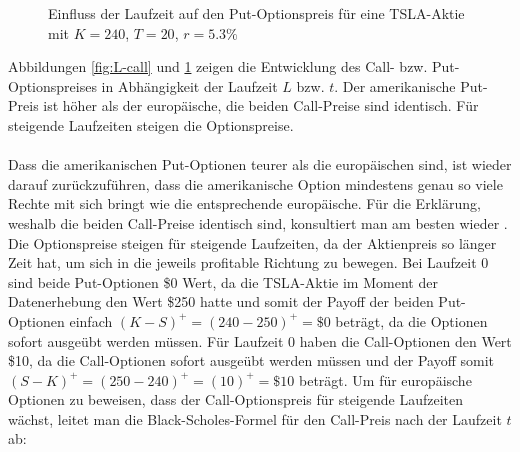 \documentclass[11pt]{report} %
\begin{document}
\begin{figure}[H]
    \centering
    \caption{Einfluss der Laufzeit auf den Put-Optionspreis für eine TSLA-Aktie mit $K=240$, $T=20$, $r=5.3\%$}
    \label{fig:L-put}
\end{figure}
Abbildungen \ref{fig:L-call} und \ref{fig:L-put} zeigen die Entwicklung des Call- bzw. Put-Optionspreises in Abhängigkeit der Laufzeit $L$ bzw. $t$. Der amerikanische Put-Preis ist höher als der europäische, die beiden Call-Preise sind identisch. Für steigende Laufzeiten steigen die Optionspreise.\\\\Dass die amerikanischen Put-Optionen teurer als die europäischen sind, ist wieder darauf zurückzuführen, dass die amerikanische Option mindestens genau so viele Rechte mit sich bringt wie die entsprechende europäische. Für die Erklärung, weshalb die beiden Call-Preise identisch sind, konsultiert man am besten wieder \textcite{Adelmeyer2003}. \\Die Optionspreise steigen für steigende Laufzeiten, da der Aktienpreis so länger Zeit hat, um sich in die jeweils profitable Richtung zu bewegen. Bei Laufzeit 0 sind beide Put-Optionen \$0 Wert, da die TSLA-Aktie im Moment der Datenerhebung den Wert \$250 hatte und somit der Payoff der beiden Put-Optionen einfach $(K-S)^+=(240-250)^+=\$0$ beträgt, da die Optionen sofort ausgeübt werden müssen. Für Laufzeit 0 haben die Call-Optionen den Wert \$10, da die Call-Optionen sofort ausgeübt werden müssen und der Payoff somit $(S-K)^+=(250-240)^+=(10)^+=\$10$ beträgt. Um für europäische Optionen zu beweisen, dass der Call-Optionspreis für steigende Laufzeiten wächst, leitet man die Black-Scholes-Formel für den Call-Preis nach der Laufzeit $t$ ab:
\end{document}
